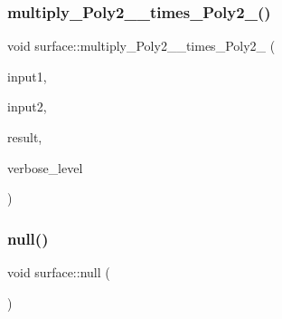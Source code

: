 \mbox{\label{classsurface_adb65ce8845726835c206e4476f5a80d3}} 
\subsubsection{\texorpdfstring{multiply\+\_\+\+Poly2\+\_\+\_\+times\+\_\+\+Poly2\+\_()}{multiply\_Poly2\_3\_times\_Poly2\_3()}}
{\footnotesize\ttfamily void surface\+::multiply\+\_\+\+Poly2\+\_\+\_\+times\+\_\+\+Poly2\+\_ (\begin{DoxyParamCaption}\item[{\mbox{\hyperlink{galois_8h_a09fddde158a3a20bd2dcadb609de11dc}{I\+NT}} $\ast$}]{input1,  }\item[{\mbox{\hyperlink{galois_8h_a09fddde158a3a20bd2dcadb609de11dc}{I\+NT}} $\ast$}]{input2,  }\item[{\mbox{\hyperlink{galois_8h_a09fddde158a3a20bd2dcadb609de11dc}{I\+NT}} $\ast$}]{result,  }\item[{\mbox{\hyperlink{galois_8h_a09fddde158a3a20bd2dcadb609de11dc}{I\+NT}}}]{verbose\+\_\+level }\end{DoxyParamCaption})}

\mbox{\label{classsurface_a5511d97327063a0ef3cbc7c27f33eede}} 
\subsubsection{\texorpdfstring{null()}{null()}}
{\footnotesize\ttfamily void surface\+::null (\begin{DoxyParamCaption}{ }\end{DoxyParamCaption})}

\mbox{\label{classsurface_a8da8a93f1fcbf344eb943869b0d488f1}} 
